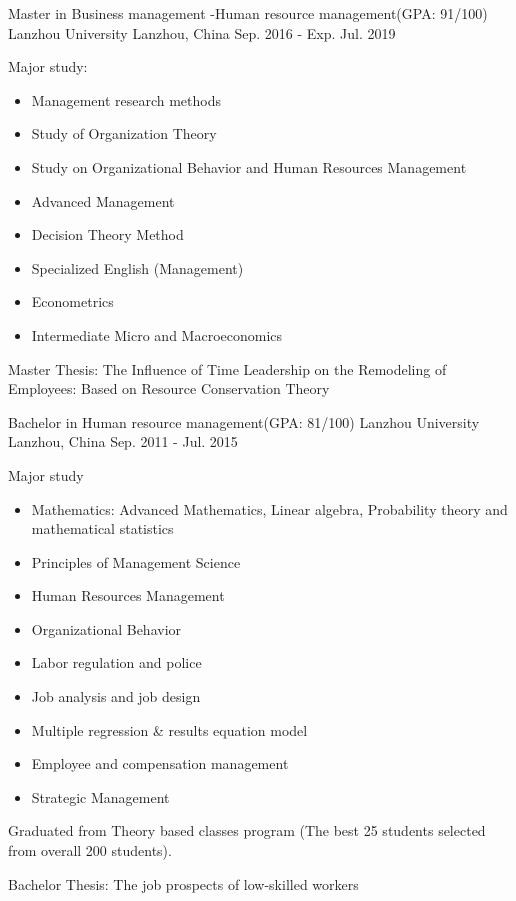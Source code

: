 \begin{cventries}
  \cventry
    {Master in Business management -Human resource management(GPA: 91/100)}
    {Lanzhou University}
    {Lanzhou, China}
    {Sep. 2016 - Exp. Jul. 2019}
    {
      \begin{cvitems}
        \item {
            Major study:
            \begin{itemize}
                \item Management research methods
		\item Study of Organization Theory
		\item Study on Organizational Behavior and Human Resources Management
                \item Advanced Management
		\item Decision Theory Method
		\item Specialized English (Management)
		\item Econometrics
		\item Intermediate Micro and Macroeconomics
	    \end{itemize}
        }
        \item {Master Thesis: The Influence of Time Leadership on the Remodeling of Employees: Based on Resource Conservation Theory}
      \end{cvitems}
    }
    \cventry
    {Bachelor in Human resource management(GPA: 81/100)}
    {Lanzhou University}
    {Lanzhou, China}
    {Sep. 2011 - Jul. 2015}
    {
      \begin{cvitems}
        \item {
            Major study
            \begin{itemize}
		\item Mathematics: Advanced Mathematics, Linear algebra, Probability theory and mathematical statistics 
		\item Principles of Management Science
                \item Human Resources Management
                \item Organizational Behavior
		\item Labor regulation and police
		\item Job analysis and job design
		\item Multiple regression \& results equation model
		\item Employee and compensation management
                \item Strategic Management            
	    \end{itemize}
        }
        \item {Graduated from Theory based classes program (The best 25 students selected from overall 200 students).}
        \item {Bachelor Thesis: The job prospects of low-skilled workers}
      \end{cvitems}
    }
\end{cventries}
